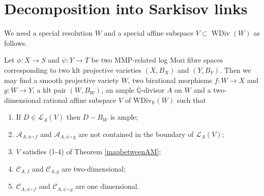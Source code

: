 \section{Decomposition into Sarkisov links}
We need a special resolution $W$ and a special affine subspace $V \subset \operatorname{WDiv}(W)$ as follows.

\begin{lemma}\label{keylem}
  \cite[Lemma 4.1]{haconSarkisovProgram2012} Let $ \phi: X \to S $ and $ \psi: Y\to T  $ be two MMP-related log Mori fibre spaces corresponding to two klt projective varieties $ (X, B_X) $ and $ (Y, B_Y) $. Then we may find a smooth projective variety $ W $, two birational morphisms $ f:W\to X $ and $ g:W\to Y $, a klt pair $ (W,B_{W}) $, an ample $ \mathbb{Q} $-divisor $ A $ on $ W $ and a two-dimensional rational affine subspace $ V $ of $ \mathrm{WDiv}_\mathbb{R}(W) $ such that
  \begin{enumerate}
    \item If $ D\in \mathcal{L}_A(V) $ then $ D-B_W $ is ample;
    \item $ \mathcal{A}_{A,\phi\circ f} $ and $ \mathcal{A}_{A,\psi\circ g} $ are not contained in the boundary of $ \mathcal{L}_A(V) $;
    \item $ V $ satisfies (1-4) of Theorem \ref{mapbetweenAM};
    \item $ \mathcal{C}_{A,f} $ and $ \mathcal{C}_{A,g} $ are two-dimensional;
    \item $ \mathcal{C}_{A,\phi\circ f} $ and $ \mathcal{C}_{A,\psi\circ g} $ are one dimensional.
  \end{enumerate}
\end{lemma}


